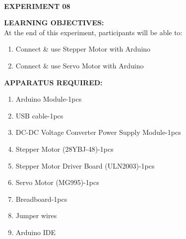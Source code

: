 \documentclass[12pt,a4paper]{article}
\begin{document}
\begin{center}

\textbf{\large \\EXPERIMENT 08 }\\[6pt]
\end{center}

\textbf{\large LEARNING OBJECTIVES:}\\[3pt]
At the end of this experiment, participants will be able to:\vspace{-6mm}\begin{enumerate}
 \setlength\itemsep{-0.3em}
\item Connect \& use Stepper Motor with Arduino \\
\item Connect \& use Servo Motor  with Arduino 
\end{enumerate}
\textbf{\large APPARATUS REQUIRED:}\\
\vspace{-3mm}
\begin{enumerate}
 \setlength\itemsep{-0.3em}
\item Arduino Module-1pcs \\
\item USB cable-1pcs\\
\item DC-DC Voltage Converter Power Supply Module-1pcs\\
\item Stepper Motor (28YBJ-48)-1pcs\\
\item Stepper Motor Driver Board (ULN2003)-1pcs\\
\item Servo Motor (MG995)-1pcs\\
\item Breadboard-1pcs\\
\item Jumper wires\\
\item Arduino IDE
\end{enumerate}
\end{document}
